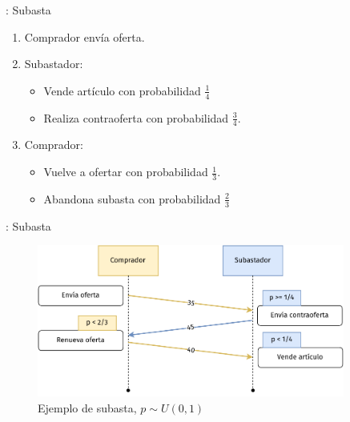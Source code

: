 %
%
%

\begin{frame}{\insertsection: Subasta}
	\begin{enumerate}
		\item Comprador envía oferta.
		\item Subastador:
			\begin{itemize}
				\item Vende artículo con probabilidad $\frac{1}{4}$
				\item Realiza contraoferta con probabilidad $\frac{3}{4}$.
			\end{itemize}
		\item Comprador:
			\begin{itemize}
				\item Vuelve a ofertar con probabilidad $\frac{1}{3}$.
				\item Abandona subasta con probabilidad $\frac{2}{3}$
			\end{itemize}
	\end{enumerate}
\end{frame}

\begin{frame}{\insertsection: Subasta}
	\begin{figure}
		\centering
		\includegraphics[width=0.9\textwidth]{images/auction-diagram.pdf}
		\caption{Ejemplo de subasta, $p \sim U(0, 1)$}
	\end{figure}
\end{frame}

